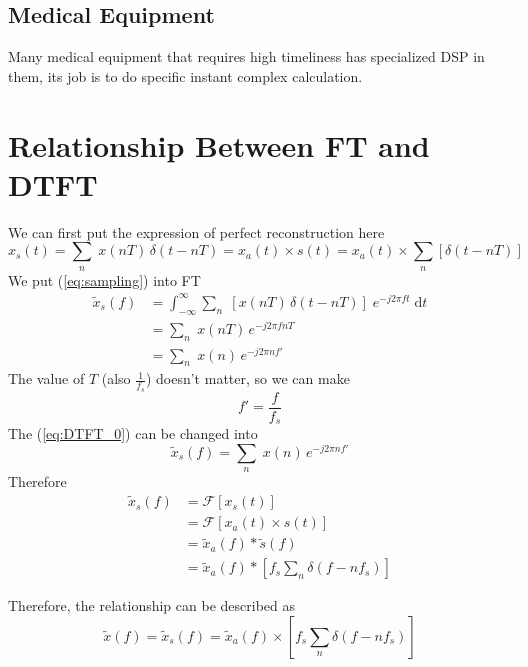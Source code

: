 \documentclass{article}
\begin{document}
\subsection{Medical Equipment}
Many medical equipment that requires high timeliness has specialized DSP in them, its job is to do specific instant complex calculation.

\section{Relationship Between FT and DTFT}
We can first put the expression of perfect reconstruction here
\begin{equation}
x_s(t) = \sum_{n} \; x(nT) \, \delta(t - nT) = x_a(t) \times s(t) =  x_a(t) \times \sum_{n} \left[ \delta(t- nT) \right]
\label{eq:sampling}
\end{equation}
We put (\ref{eq:sampling}) into FT
\begin{equation}
\begin{aligned}
	\widetilde{x}_s(f) &= \int_{- \infty}^{\infty} \sum_{n} \; \left[  x(nT) \, \delta(t - nT) \right] \; e^{-j 2\pi ft}\; \mathrm{d} t \\
	&= \sum_{n} \; x(nT)  \, e^{-j 2\pi f nT} \\ 
	&=\sum_{n} \; x(n)  \, e^{-j 2\pi n f'}
\end{aligned}
\label{eq:DTFT_0}
\end{equation}
The value of $T$ (also $\frac{1}{f_s}$) doesn't matter, so we can make 
$$
f' = \frac{f}{f_s} 
$$
The (\ref{eq:DTFT_0}) can be changed into
\begin{equation*}
\widetilde{x}_s(f) = \sum_{n} \; x(n)  \, e^{-j 2\pi n f'}
\end{equation*}
Therefore
\begin{equation*}
\begin{aligned}
\widetilde{x}_s(f) &= \mathcal{F} \left[ x_s(t) \right] \\ 
&= \mathcal{F} \left[ x_a(t) \times s(t) \right] \\ 
&= \widetilde{x}_a(f) *\widetilde{s}(f) \\ 
&= \widetilde{x}_a(f) * \left[ f_s \sum_n \delta(f - nf_s) \right]
\end{aligned}
\end{equation*}

Therefore, the relationship can be described as
\begin{equation}
	\widetilde{x}(f) = \widetilde{x}_s(f) = \widetilde{x}_a(f) \times \left[ f_s \sum_n \delta(f - nf_s) \right]
\label{eq:relationship}
\end{equation}
\end{document}
